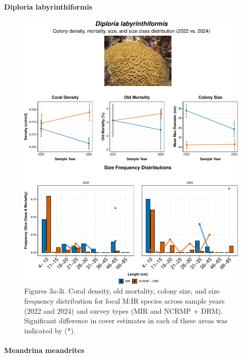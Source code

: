 \documentclass[
]{article}
\let\oldparagraph\paragraph
\renewcommand{\paragraph}[1]{\oldparagraph{#1}\mbox{}}
\begin{document}
\hypertarget{diploria-labyrinthiformis}{%
\paragraph{\texorpdfstring{ Diploria labyrinthiformis
}{ Diploria labyrinthiformis }}\label{diploria-labyrinthiformis}}

\begin{figure}

{\centering \includegraphics{MIR_quarto_files/figure-pdf/coral-tabyss-5.pdf}

}

\caption{Figures 3a-3i. Coral density, old mortality, colony size, and
size frequency distribution for focal M:IR species across sample years
(2022 and 2024) and survey types (MIR and NCRMP + DRM). Significant
difference in cover estimates in each of these areas was indicated by
(*).}

\end{figure}

\hypertarget{meandrina-meandrites}{%
\paragraph{\texorpdfstring{ Meandrina meandrites
}{ Meandrina meandrites }}\label{meandrina-meandrites}}
\end{document}
